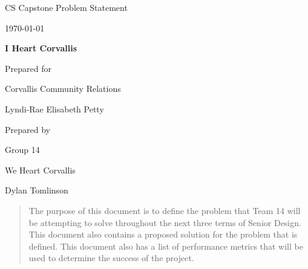 \documentclass[onecolumn, draftclsnofoot,10pt, compsoc]{IEEEtran}
\def \CapstoneTeamName{		We Heart Corvallis}
\def \CapstoneTeamNumber{		14}
\def \GroupMemberOne{			Dylan Tomlinson}
\def \CapstoneProjectName{		I Heart Corvallis}
\def \CapstoneSponsorCompany{	Corvallis Community Relations}
\def \CapstoneSponsorPerson{		Lyndi-Rae Elisabeth Petty}
\def \DocType{		Problem Statement
				}
\newcommand{\NameSigPair}[1]{\par
\makebox[2.75in][r]{#1} \hfil 	\makebox[3.25in]{\makebox[2.25in]{\hrulefill} \hfill		\makebox[.75in]{\hrulefill}}
\par\vspace{-12pt} \textit{\tiny\noindent
\makebox[2.75in]{} \hfil		\makebox[3.25in]{\makebox[2.25in][r]{Signature} \hfill	\makebox[.75in][r]{Date}}}}
\renewcommand{\NameSigPair}[1]{#1}
\begin{document}
\begin{titlepage}
    \begin{singlespace}
        \hfill 
        \par\vspace{.2in}
        \centering
        \scshape{
            \huge CS Capstone \DocType \par
            {\large\today}\par
            \vspace{.5in}
            \textbf{\Huge\CapstoneProjectName}\par
            \vfill
            {\large Prepared for}\par
            \Huge \CapstoneSponsorCompany\par
            \vspace{5pt}
            {\Large\NameSigPair{\CapstoneSponsorPerson}\par}
            {\large Prepared by }\par
            Group\CapstoneTeamNumber\par
            \CapstoneTeamName\par 
            \vspace{5pt}
            {\Large
                \NameSigPair{\GroupMemberOne}\par
            }
            \vspace{20pt}
        }
        \begin{abstract}
            The purpose of this document is to define the problem that Team 14 will be attempting to solve throughout the
            next three terms of Senior Design. This document also contains a proposed solution for the problem that
            is defined. This document also has a list of performance metrics that will be used to determine the
            success of the project.
        \end{abstract}     
    \end{singlespace}
\end{titlepage}
\newpage
{}
\tableofcontents
\clearpage
\end{document}
